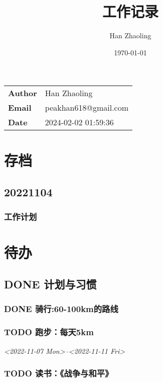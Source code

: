 \documentclass[11pt]{article}
\author{Han Zhaoling}
\date{\today}
\title{工作记录}
\begin{document}
\maketitle
\begin{center}
\begin{tabular}{ll}
\textbf{Author} & Han Zhaoling\\[0pt]
\textbf{Email} & peakhan618@gmail.com\\[0pt]
\textbf{Date} & 2024-02-02 01:59:36\\[0pt]
\end{tabular}
\end{center}
\setcounter{tocdepth}{3}
\tableofcontents

\section{存档}
\label{sec:orgbc8395c}
\subsection{20221104}
\label{sec:org6cc482e}





\subsubsection{工作计划}
\label{sec:orgc500675}
\section{待办}
\label{sec:orgbef093c}

\subsection{{\bfseries\sffamily DONE} 计划与习惯}
\label{sec:orga4748e4}
\subsubsection{{\bfseries\sffamily DONE} 骑行:60-100km的路线}
\label{sec:org846a5d6}
\subsubsection{{\bfseries\sffamily TODO} 跑步：每天5km}
\label{sec:orgcedf03d}
\textit{<2022-11-07 Mon>--<2022-11-11 Fri>}

\subsubsection{{\bfseries\sffamily TODO} 读书：《战争与和平》}
\label{sec:orgdcf898b}
\end{document}
